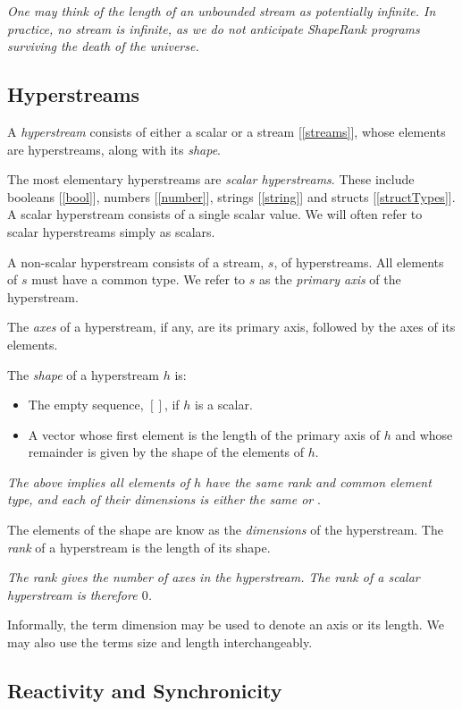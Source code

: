 \documentclass{article}
\begin{document}
{\em One may think of the length of an unbounded stream as potentially infinite. In practice, no stream is infinite, as we do not anticipate ShapeRank programs surviving the death of the universe.
}

\subsection{Hyperstreams}
\label{hyperstreams}

A {\em hyperstream} consists of either a scalar or a stream [\ref{streams}], whose elements are hyperstreams, along with 
 its  {\em shape}. 

The most elementary hyperstreams are {\em scalar hyperstreams}. These include  booleans [\ref{bool}], numbers [\ref{number}], strings [\ref{string}] and  structs [\ref{structTypes}]. A scalar hyperstream consists of a single scalar value.  We will often refer to scalar hyperstreams simply as scalars.

A non-scalar hyperstream consists of a stream, $s$, of hyperstreams. All elements of $s$ must have a common type.
We refer to $s$ as the {\em primary axis} of the hyperstream.

The {\em axes} of a hyperstream, if any, are its primary axis, followed by the axes of its elements. 

The {\em shape} of a hyperstream $h$ is:
\begin{itemize}
\item  The empty sequence, $[]$, if  $h$ is a scalar. 
\item A vector whose first element is the length of the primary axis of $h$ and whose remainder is given by the shape of the elements of $h$. 
\end{itemize}

{\em The above implies all elements of $h$ have the same rank and common element type, and each of their dimensions is either the same or \QUESTIONMARK}.
 
The elements of the shape are know as  the {\em dimensions} of the hyperstream.
 The {\em rank} of a hyperstream is the length of its shape.

{\em
The rank  gives the number of axes in the hyperstream. The rank of a scalar hyperstream is therefore $0$.
}

Informally, the term dimension may be used to denote an axis or its length. We may also use the terms size and length interchangeably.


\subsection{Reactivity and Synchronicity}
\label{reactivityAndSynchronicity}
\end{document}
